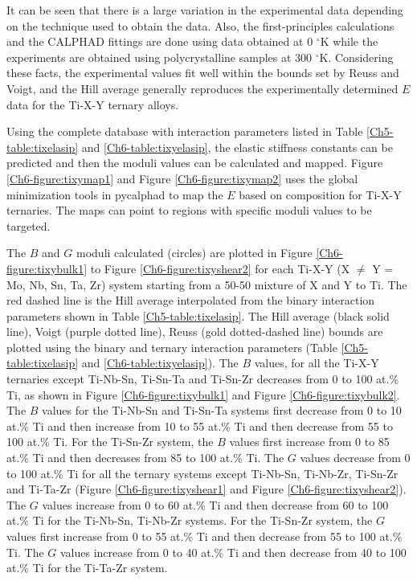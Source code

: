 It can be seen that there is a large variation in the experimental data depending on the technique used to obtain the data. Also, the first-principles calculations and the CALPHAD fittings are done using data obtained at 0 $^{\circ}$K while the experiments are obtained using polycrystalline samples at 300 $^{\circ}$K. Considering these facts, the experimental values fit well within the bounds set by Reuss and Voigt, and the Hill average generally reproduces the experimentally determined $E$ data for the Ti-X-Y ternary alloys. 

Using the complete database with interaction parameters listed in Table \ref{Ch5-table:tixelasip} and \ref{Ch6-table:tixyelasip}, the elastic stiffness constants can be predicted and then the moduli values can be calculated and mapped. Figure \ref{Ch6-figure:tixymap1} and Figure \ref{Ch6-figure:tixymap2} uses the global minimization tools in pycalphad \cite{Otis2017} to map the $E$ based on composition for Ti-X-Y ternaries. The maps can point to regions with specific moduli values to be targeted. 

The $B$ and $G$ moduli calculated (circles) are plotted in Figure \ref{Ch6-figure:tixybulk1} to Figure \ref{Ch6-figure:tixyshear2} for each Ti-X-Y (X $\neq$ Y = Mo, Nb, Sn, Ta, Zr) system starting from a 50-50 mixture of X and Y to Ti. The red dashed line is the Hill average interpolated from the binary interaction parameters shown in Table \ref{Ch5-table:tixelasip}. The Hill average (black solid line), Voigt (purple dotted line), Reuss (gold dotted-dashed line) bounds are plotted using the binary and ternary interaction parameters (Table \ref{Ch5-table:tixelasip} and \ref{Ch6-table:tixyelasip}). The $B$ values, for all the Ti-X-Y ternaries except Ti-Nb-Sn, Ti-Sn-Ta and Ti-Sn-Zr decreases from 0 to 100 at.\% Ti, as shown in Figure \ref{Ch6-figure:tixybulk1} and Figure \ref{Ch6-figure:tixybulk2}. The $B$ values for the Ti-Nb-Sn and Ti-Sn-Ta systems first decrease from 0 to 10 at.\% Ti and then increase from 10 to 55 at.\% Ti and then decrease from 55 to 100 at.\% Ti. For the Ti-Sn-Zr system, the $B$ values first increase from 0 to 85 at.\% Ti and then decreases from 85 to 100 at.\% Ti. The $G$ values decrease from 0 to 100 at.\% Ti for all the ternary systems except Ti-Nb-Sn, Ti-Nb-Zr, Ti-Sn-Zr and Ti-Ta-Zr (Figure \ref{Ch6-figure:tixyshear1} and Figure \ref{Ch6-figure:tixyshear2}). The $G$ values increase from 0 to 60 at.\% Ti and then decrease from 60 to 100 at.\% Ti for the Ti-Nb-Sn, Ti-Nb-Zr systems. For the Ti-Sn-Zr system, the $G$ values first increase from 0 to 55 at.\% Ti and then decrease from 55 to 100 at.\% Ti. The $G$ values increase from 0 to 40 at.\% Ti and then decrease from 40 to 100 at.\% Ti for the Ti-Ta-Zr system. 

